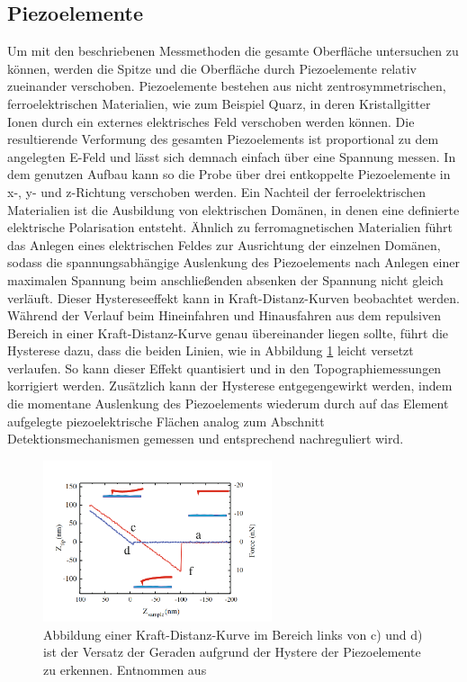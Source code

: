       
      
      
      \newpage
      \subsection{Piezoelemente}
          Um mit den beschriebenen Messmethoden die gesamte Oberfläche untersuchen zu können, werden die Spitze und die Oberfläche durch Piezoelemente relativ zueinander verschoben. Piezoelemente bestehen aus 
          nicht zentrosymmetrischen, ferroelektrischen Materialien, wie zum Beispiel Quarz, in deren Kristallgitter Ionen durch ein externes elektrisches Feld verschoben werden können. Die resultierende 
          Verformung des gesamten Piezoelements ist proportional zu dem angelegten E-Feld und lässt sich demnach einfach über eine Spannung messen. In dem genutzen Aufbau kann so die Probe über drei 
          entkoppelte Piezoelemente in x-, y- und z-Richtung verschoben werden. Ein Nachteil der ferroelektrischen Materialien ist die Ausbildung von elektrischen Domänen, in denen eine definierte elektrische
          Polarisation entsteht. Ähnlich zu ferromagnetischen Materialien führt das Anlegen eines elektrischen Feldes zur Ausrichtung der einzelnen Domänen, sodass die spannungsabhängige Auslenkung des
          Piezoelements nach Anlegen einer maximalen Spannung beim anschließenden absenken der Spannung nicht gleich verläuft. Dieser Hystereseeffekt kann in Kraft-Distanz-Kurven beobachtet werden. 
          Während der Verlauf beim Hineinfahren und Hinausfahren aus dem repulsiven Bereich in einer Kraft-Distanz-Kurve genau übereinander liegen sollte, führt die
          Hysterese dazu, dass die beiden Linien, wie in Abbildung \ref{fig:hysterese} leicht versetzt verlaufen. So kann dieser Effekt quantisiert und in den Topographiemessungen korrigiert werden. Zusätzlich kann der Hysterese entgegengewirkt werden, 
          indem die momentane Auslenkung des Piezoelements wiederum durch auf das Element aufgelegte piezoelektrische Flächen analog zum Abschnitt Detektionsmechanismen gemessen und entsprechend nachreguliert wird. 


          \FloatBarrier

          \begin{figure}[h]
            \centering
            \includegraphics[width = 0.6\textwidth]{pictures/hysterese.png}
            \caption{Abbildung einer Kraft-Distanz-Kurve im Bereich links von c) und d) ist der Versatz der Geraden aufgrund der Hystere der Piezoelemente zu erkennen. Entnommen aus \cite{voigtlander_scanning_2015}}
            \label{fig:hysterese}
          \end{figure}
        
          \FloatBarrier



           

